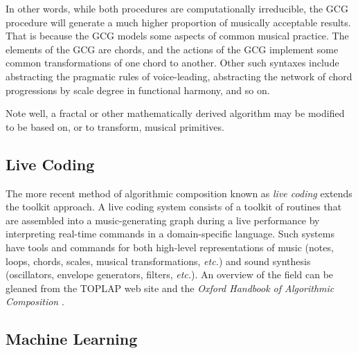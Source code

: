 \documentclass[11pt,papersize=a4]{scrartcl}
\begin{document}
In other words, while both procedures are computationally irreducible, the GCG procedure will generate a much higher proportion of musically acceptable results. That is because the GCG models some aspects of common musical practice. The elements of the GCG are chords, and the actions of the GCG implement some common transformations of one chord to another. Other such syntaxes include abstracting the pragmatic rules of voice-leading, abstracting the network of chord progressions by scale degree in functional harmony, and so on.

Note well, a fractal or other mathematically derived algorithm may be modified to be based on, or to transform, musical primitives.

\subsection*{Live Coding}

The more recent method of algorithmic composition known as \emph{live coding} extends the toolkit approach. A live coding system consists of a toolkit of routines that are assembled into a music-generating graph during a live performance by interpreting real-time commands in a domain-specific language. Such systems have tools and commands for both high-level representations of music (notes, loops, chords, scales, musical transformations, \emph{etc.}) and sound synthesis (oscillators, envelope generators, filters, \emph{etc.}). An overview of the field can be gleaned from the TOPLAP web site \parencite{toplap} and the \emph{Oxford Handbook of Algorithmic Composition} \parencite{mclean2018oxford}.

\subsection*{Machine Learning}
\end{document}
